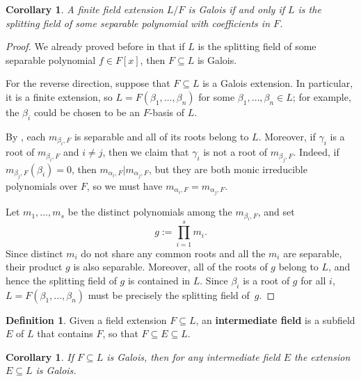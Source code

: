 \documentclass[12pt]{report}
\newtheorem{corollary}[theorem]{Corollary}
\numberwithin{equation}{section}
\numberwithin{theorem}{chapter}
\theoremstyle{definition}
\newtheorem{definition}[theorem]{Definition}
\newtheorem*{basic properties}{Basic Properties}
\newtheorem*{Important Remark}{Important Remark}
\newcommand{\df}[1]{{\bf #1}\index{#1}}
\begin{document}
\begin{corollary}\label{galois iff splitting field of separable poly}
	A finite field extension $L/F$ is Galois if and only if $L$ is the splitting field of some separable polynomial with coefficients in $F$.
\end{corollary}

\begin{proof} 
We already proved before in  that if $L$ is the splitting field of some separable polynomial $f \in F[x]$, then $F \subseteq L$ is Galois. 

For the reverse direction, suppose that $F \subseteq L$ is a Galois extension. In particular, it is a finite extension, so $L = F(\beta_1, \ldots, \beta_n)$ for some $\beta_1, \dots, \beta_n \in L$; for example, the $\beta_i$ could be chosen to be an $F$-basis of $L$.

By , each $m_{\beta_i,F}$ is separable and all of its roots belong to $L$. Moreover, if $\gamma_i$ is a root of $m_{\beta_i,F}$ and $i \neq j$, then we claim that $\gamma_i$ is not a root of $m_{\beta_j,F}$. Indeed, if $m_{\beta_j,F}(\beta_i) = 0$, then $m_{\alpha_i,F} | m_{\alpha_j,F}$, but they are both monic irreducible polynomials over $F$, so we must have $m_{\alpha_i,F} = m_{\alpha_j,F}$.

Let $m_1, \ldots, m_s$ be the distinct polynomials among the $m_{\beta_i,F}$, and set
$$g := \prod_{i=1}^s m_i.$$ 
Since distinct $m_i$ do not share any common roots and all the $m_i$ are separable, their product $g$ is also separable. Moreover, all of the roots of $g$ belong to $L$, and hence the splitting field of $g$ is contained in $L$. Since $\beta_i$ is a root of $g$ for all $i$, $L = F(\beta_1, \ldots, \beta_n)$ must be precisely the splitting field of~$g$.
\end{proof}







\begin{definition}
Given a field extension $F \subseteq L$, an \df{intermediate field} is a subfield $E$ of $L$ that contains $F$, so that $F \subseteq E
\subseteq L$.
\end{definition}

\begin{corollary}\label{galois extension intermediate also galois}
If $F \subseteq L$ is Galois, then for any intermediate field $E$ the extension $E \subseteq L$ is Galois.
\end{corollary}
\end{document}
